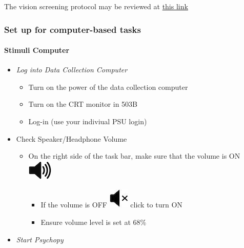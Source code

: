 \documentclass[]{article}
\providecommand{\tightlist}{%
  \setlength{\itemsep}{0pt}\setlength{\parskip}{0pt}}
\let\oldparagraph\paragraph
\renewcommand{\paragraph}[1]{\oldparagraph{#1}\mbox{}}
\begin{document}
The vision screening protocol may be reviewed at
\href{vision-screening-protocol.html}{this link}

\hypertarget{set-up-for-computer-based-tasks}{%
\subsubsection{Set up for computer-based
tasks}\label{set-up-for-computer-based-tasks}}

\hypertarget{stimuli-computer}{%
\paragraph{Stimuli Computer}\label{stimuli-computer}}

\begin{itemize}
\tightlist
\item
  \emph{Log into Data Collection Computer}

  \begin{itemize}
  \tightlist
  \item
    Turn on the power of the data collection computer
  \item
    Turn on the CRT monitor in 503B
  \item
    Log-in (use your indiviual PSU login)
  \end{itemize}
\item
  Check Speaker/Headphone Volume

  \begin{itemize}
  \tightlist
  \item
    On the right side of the task bar, make sure that the volume is ON
    \includegraphics{images/volume_on.png}

    \begin{itemize}
    \tightlist
    \item
      If the volume is OFF \includegraphics{images/audio_off.jpeg} click
      to turn ON
    \item
      Ensure volume level is set at 68\%
    \end{itemize}
  \end{itemize}
\item
  \emph{Start Psychopy}


\end{itemize}
\end{document}

